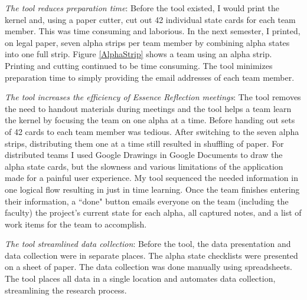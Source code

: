 \documentclass[preprint,12pt,3p]{elsarticle}
\begin{document}
\textit{The tool reduces preparation time}: Before the tool existed, I would print the kernel and, using a paper cutter, cut out 42 individual state cards for each team member. This was time consuming and laborious.  In the next semester, I printed, on legal paper, seven alpha strips per team member by combining alpha states into one full strip. Figure \ref{AlphaStrip} shows a team using an alpha strip. Printing and cutting continued to be time consuming. The tool minimizes preparation time to simply providing the email addresses of each team member. 

\textit{The tool increases the efficiency of Essence Reflection meetings}: The tool removes the need to handout materials during meetings and the tool helps a team learn the kernel by focusing the team on one alpha at a time. Before handing out sets of 42 cards to each team member was tedious. After switching to the seven alpha strips, distributing them one at a time still resulted in shuffling of paper. For distributed teams I used Google Drawings in Google Documents to draw the alpha state cards, but the slowness and various limitations of the application made for a painful user experience. My tool sequenced the needed information in one logical flow resulting in just in time learning. Once the team finishes entering their information, a ``done" button emails everyone on the team (including the faculty) the project's current state for each alpha, all captured notes, and a list of work items for the team to accomplish. 

\textit{The tool streamlined data collection}:  Before the tool, the data presentation and data collection were in separate places. The alpha state checklists were presented on a sheet of paper. The data collection was done manually using spreadsheets. The tool places all data in a single location and automates data collection, streamlining the research process.

\end{document}
